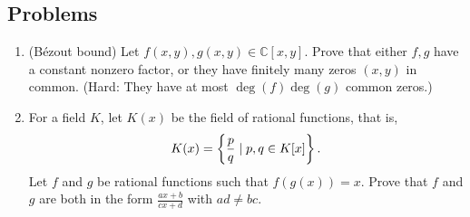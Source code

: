 \subsection{Problems}
\begin{enumerate}
\item
(B\'{e}zout bound) Let $f(x,y),g(x,y)\in \mathbb C [x,y]$. Prove that either $f,g$ have a constant nonzero factor, or they have finitely many zeros $(x,y)$ in common. (Hard: They have at most $\deg(f)\deg(g)$ common zeros.)
\item
For a field $K$, let $K(x)$ be the field of rational functions, that is,
\[K(x)=\left\{ {\frac pq\mid p,q\in K[x]} \right\}.\]
Let $f$ and $g$ be rational functions such that $f(g(x))=x$. Prove that $f$ and $g$ are both in the form $\frac{ax+b}{cx+d}$ with $ad\neq bc$.
\end{enumerate}
